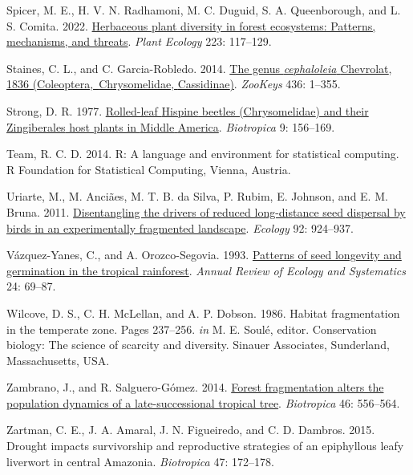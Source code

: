 \documentclass[
  12pt,
  man, donotrepeattitle,floatsintext]{apa6}
\newlength{\cslhangindent}
\newlength{\cslentryspacingunit} %
\newenvironment{CSLReferences}[2] %
 {%
  \setlength{\parindent}{0pt}
  \ifodd #1
  \let\oldpar\par
  \def\par{\hangindent=\cslhangindent\oldpar}
  \fi
  \setlength{\parskip}{#2\cslentryspacingunit}
 }%
 {}
\begin{document}
\begin{CSLReferences}{1}{0}
\leavevmode{}%
Spicer, M. E., H. V. N. Radhamoni, M. C. Duguid, S. A. Queenborough, and L. S. Comita. 2022. \href{https://doi.org/10.1007/s11258-021-01202-9}{Herbaceous plant diversity in forest ecosystems: Patterns, mechanisms, and threats}. \emph{Plant Ecology} 223: 117--129.

\leavevmode{}%
Staines, C. L., and C. Garcia-Robledo. 2014. \href{https://doi.org/10.3897/zookeys.436.5766}{The genus \emph{cephaloleia} {Chevrolat}, 1836 ({Coleoptera},~{Chrysomelidae}, {Cassidinae})}. \emph{ZooKeys} 436: 1--355.

\leavevmode{}%
Strong, D. R. 1977. \href{https://doi.org/10.2307/2387878}{Rolled-leaf {Hispine} beetles ({Chrysomelidae}) and their {Zingiberales} host plants in {Middle} {America}}. \emph{Biotropica} 9: 156--169.

\leavevmode{}%
Team, R. C. D. 2014. R: {A} language and environment for statistical computing. R Foundation for Statistical Computing, Vienna, Austria.

\leavevmode{}%
Uriarte, M., M. Anciães, M. T. B. da Silva, P. Rubim, E. Johnson, and E. M. Bruna. 2011. \href{https://doi.org/10.1890/10-0709.1}{Disentangling the drivers of reduced long-distance seed dispersal by birds in an experimentally fragmented landscape}. \emph{Ecology} 92: 924--937.

\leavevmode{}%
Vázquez-Yanes, C., and A. Orozco-Segovia. 1993. \href{https://doi.org/10.1146/annurev.es.24.110193.000441}{Patterns of seed longevity and germination in the tropical rainforest}. \emph{Annual Review of Ecology and Systematics} 24: 69--87.

\leavevmode{}%
Wilcove, D. S., C. H. McLellan, and A. P. Dobson. 1986. Habitat fragmentation in the temperate zone. Pages 237--256. \emph{in} M. E. Soulé, editor. Conservation biology: {The} science of scarcity and diversity. Sinauer Associates, Sunderland, Massachusetts, USA.

\leavevmode{}%
Zambrano, J., and R. Salguero-Gómez. 2014. \href{https://doi.org/10.1111/btp.12144}{Forest fragmentation alters the population dynamics of a late-successional tropical tree}. \emph{Biotropica} 46: 556--564.

\leavevmode{}%
Zartman, C. E., J. A. Amaral, J. N. Figueiredo, and C. D. Dambros. 2015. Drought impacts survivorship and reproductive strategies of an epiphyllous leafy liverwort in central {Amazonia}. \emph{Biotropica} 47: 172--178.

\end{CSLReferences}
\end{document}
